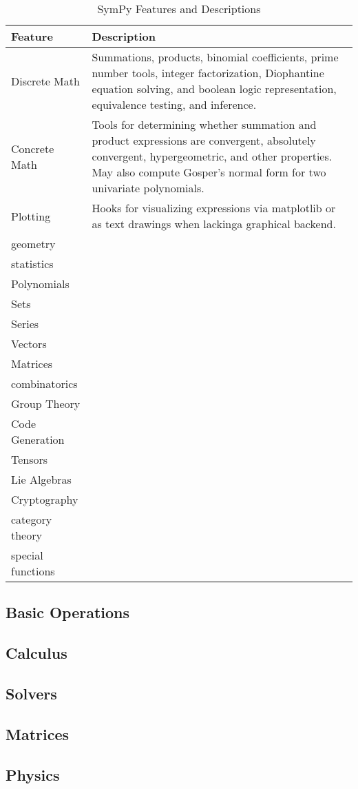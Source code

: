 
\begin{table}
\label{features-table}
\caption{SymPy Features and Descriptions}
\begin{tabular}[htbc]{|l|l|}
\hline
\textbf{Feature} & \textbf{Description} \\
\hline
Discrete Math & Summations, products, binomial coefficients, prime number
    tools, integer factorization, Diophantine equation solving, and
    boolean logic representation, equivalence testing, and inference.\\
Concrete Math & Tools for determining whether summation and product
    expressions are convergent, absolutely convergent, hypergeometric, and
    other properties. May also compute Gosper's normal form
    \cite{petkovvsek1996bak} for two univariate polynomials.\\
Plotting & Hooks for visualizing expressions via matplotlib \cite{Hunter:2007}
    or as text drawings when lackinga graphical backend.\\
geometry & \\
statistics & \\
Polynomials & \\
Sets & \\
Series & \\
Vectors & \\
Matrices & \\
combinatorics & \\
Group Theory & \\
Code Generation & \\
Tensors & \\
Lie Algebras & \\
Cryptography & \\
category theory & \\
special functions & \\
\hline
\end{tabular}
\end{table}


\subsection{Basic Operations}

\subsection{Calculus}

\subsection{Solvers}

\subsection{Matrices}

\subsection{Physics}


